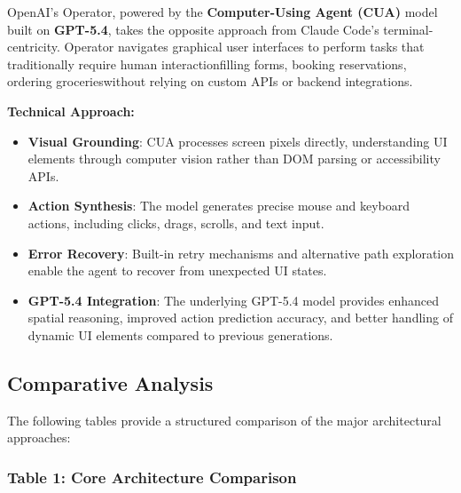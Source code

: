 OpenAI's Operator, powered by the \textbf{Computer-Using Agent (CUA)} model built on \textbf{GPT-5.4}, takes the opposite approach from Claude Code's terminal-centricity. Operator navigates graphical user interfaces to perform tasks that traditionally require human interactionfilling forms, booking reservations, ordering grocerieswithout relying on custom APIs or backend integrations.

\textbf{Technical Approach:}

\begin{itemize}
    \item \textbf{Visual Grounding}: CUA processes screen pixels directly, understanding UI elements through computer vision rather than DOM parsing or accessibility APIs.
    \item \textbf{Action Synthesis}: The model generates precise mouse and keyboard actions, including clicks, drags, scrolls, and text input.
    \item \textbf{Error Recovery}: Built-in retry mechanisms and alternative path exploration enable the agent to recover from unexpected UI states.
    \item \textbf{GPT-5.4 Integration}: The underlying GPT-5.4 model provides enhanced spatial reasoning, improved action prediction accuracy, and better handling of dynamic UI elements compared to previous generations.

\end{itemize}
\subsection{Comparative Analysis}

The following tables provide a structured comparison of the major architectural approaches:

\subsubsection{Table 1: Core Architecture Comparison}

